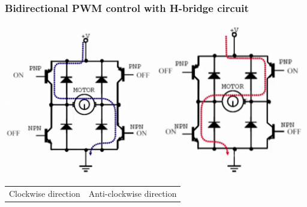 \documentclass[11pt]{article}
\begin{document}
\subsubsection{Bidirectional PWM control with H-bridge circuit}
\label{sec:org0bd24ba}

\begin{center}
\includegraphics[width=0.49\textwidth]{./images/bidirectional-pwm-control-with-h-bridge-clockwise.png}
\includegraphics[width=0.49\textwidth]{./images/bidirectional-pwm-control-with-h-bridge-anti-clockwise.png}
\end{center}

\begin{center}
\begin{tabular}{>{\centering\arraybackslash}m{} >{\centering\arraybackslash}m{}}
Clockwise direction & Anti-clockwise direction\\[0pt]
\end{tabular}
\end{center}
\end{document}
